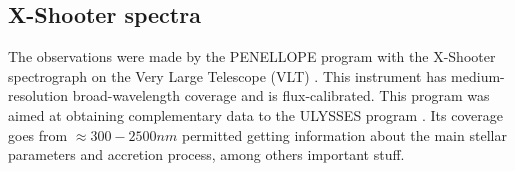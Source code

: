 \documentclass[twocolumn,linenumbers]{aastex631}
\newcommand{\Mdot}{{\dot{{M}}}}
\newcommand{\msun}{ M_{\sun}}
\newcommand{\rsun}{ R_{\sun}}
\newcommand{\lsun}{ L_{\sun}}
\newcommand{\msunyr}{M_{\sun} \, \rm{ yr^{-1}}}
\newcommand{\teff}{T$_{\rm eff}$}
\begin{document}
\begin{table}[]
\caption{Stellar parameters of the CTTS sample \citep{manara2021}}

\centering
{}
\end{table}

\subsection{X-Shooter spectra}

The observations were made by the PENELLOPE program with the X-Shooter spectrograph on the Very Large Telescope (VLT) \citep{vernet2011}. This instrument has medium-resolution broad-wavelength coverage and is flux-calibrated. This program was aimed at obtaining complementary data to the ULYSSES program \citep{roman-duval2020}.  Its coverage goes from $\approx 300-2500nm$ permitted getting information about the main stellar parameters and accretion process, among others important stuff. 
\end{document}
